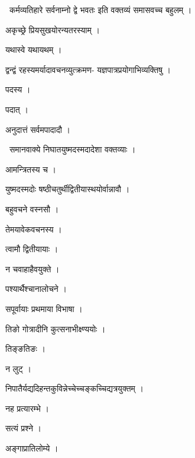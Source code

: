 \documentclass[10pt, openany, oneside]{book}
\begin{document}
\par\noindent\hspace{1.5em}{\vps वा॰}~{\qt कर्मव्यतिहारे सर्वनाम्नो द्वे भवतः इति वक्तव्यं समासवच्च बहुलम् ।}

\noindent अकृच्छ्रे प्रियसुखयोरन्यतरस्याम् ।

\noindent यथास्वे यथायथम् ।

\noindent द्वन्द्वं रहस्यमर्यादावचनव्युत्क्रमण- यज्ञपात्रप्रयोगाभिव्यक्तिषु ।

\noindent पदस्य ।

\noindent पदात् ।

\noindent अनुदात्तं सर्वमपादादौ ।

\par\noindent\hspace{1.5em}{\vps वा॰}~{\qt समानवाक्ये निघातयुष्मदस्मदादेशा वक्तव्याः ।}

\noindent आमन्त्रितस्य च ।

\noindent युष्मदस्मदोः षष्ठीचतुर्थीद्वितीयास्थयोर्वान्नावौ ।

\noindent बहुवचने वस्नसौ ।

\noindent तेमयावेकवचनस्य ।

\noindent त्वामौ द्वितीयायाः ।

\noindent न चवाहाहैवयुक्ते ।

\noindent पश्यार्थैश्चानालोचने ।

\noindent सपूर्वायाः प्रथमाया विभाषा ।

\noindent तिङो गोत्रादीनि कुत्सनाभीक्ष्ण्ययोः ।

\noindent तिङ्ङतिङः ।

\noindent न लुट् ।

\noindent निपातैर्यद्यदिहन्तकुविन्नेच्चेच्चङ्कच्चिद्यत्रयुक्तम् ।

\noindent नह प्रत्यारम्भे ।

\noindent सत्यं प्रश्ने ।

\noindent अङ्गाप्रातिलोम्ये ।
\end{document}
